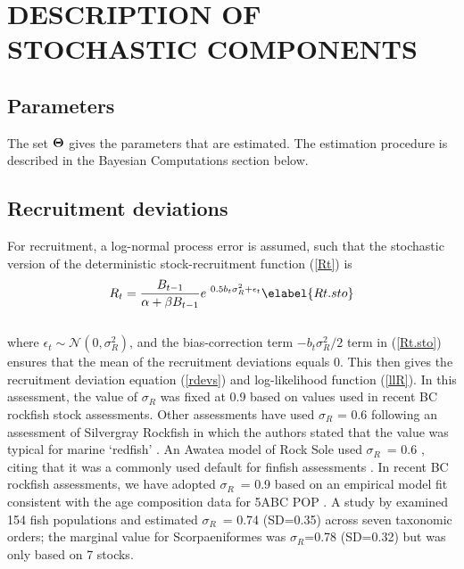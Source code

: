 \documentclass[11pt]{book}
\newcommand{\Norm}{\mathcal{N}}%
\def\bfTh{{\bf \Theta}}%
\def\minus{%
  \setbox0=\hbox{-}%
  \vcenter{%
    \hrule width\wd0 height 0.05pt%
  }%
}
\def\bfTh{{\bf \Theta}}          %
\def\vsd{\vspace*{1ex}}     %
\newcommand{\eref}[1]{(\ref{#1})}
\renewcommand{\eb}{\vsd \vsd \begin{eqnarray}}
\renewcommand{\ee}{\end{eqnarray} \vsd }
\begin{document}
\section{DESCRIPTION OF STOCHASTIC COMPONENTS}

\subsection{Parameters}

The set $\bfTh$ gives the parameters that are estimated. 
The estimation procedure is described in the Bayesian Computations section below.

\subsection{Recruitment deviations}

For recruitment, a log-normal process error is assumed, such that the stochastic version of the deterministic stock-recruitment function (\ref{Rt}) is
\eb
R_t = \frac{B_{t-1}}{\alpha + \beta B_{t-1}} e^{\minus 0.5 b_t \sigma_R^2 + \epsilon_t} \elabel{Rt.sto}
\ee \\[-0.25ex]


where $\epsilon_t \sim \Norm(0, \sigma_R^2)$, and the bias-correction term $-b_t \sigma_R^2/2$ term in \eref{Rt.sto} ensures that the mean of the recruitment deviations equals 0. 
This then gives the recruitment deviation equation (\ref{rdevs}) and log-likelihood function (\ref{llR}). 
In this assessment, the value of $\sigma_R$ was fixed at 0.9 based on values used in recent BC rockfish stock assessments.
Other assessments have used $\sigma_R$ = 0.6 following an assessment of Silvergray Rockfish \citep{Starr-etal:2016_sgr} in which the authors stated that the value was typical for marine `redfish' \citep{Mertz-Myers:1996}.
An Awatea model of Rock Sole used $\sigma_R$~= 0.6 \citep{Holt-etal:2016_rol}, citing that it was a commonly used default for finfish assessments \citep{Beddington-Cooke:1983}.
In recent BC rockfish assessments, we have adopted $\sigma_R$~= 0.9 based on an empirical model fit consistent with the age composition data for 5ABC POP \citep{Edwards-etal:2012_pop5ABC}.
A study by \citet{Thorson-etal:2014} examined 154 fish populations and estimated $\sigma_R$~= 0.74 (SD=0.35) across seven taxonomic orders; the marginal value for Scorpaeniformes was $\sigma_R$=0.78 (SD=0.32) but was only based on 7 stocks.
\end{document}
